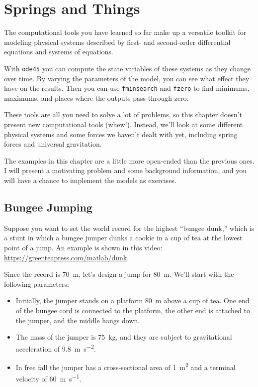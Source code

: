 \chapter{Springs and Things}


The computational tools you have learned so far make up a versatile toolkit for modeling physical systems described by first- and second-order differential equations and systems of equations.

With \lstinline{ode45} you can compute the state variables of these systems as they change over time.
By varying the parameters of the model, you can see what effect they have on the results.
Then you can use \lstinline{fminsearch} and \lstinline{fzero} to find minimums, maximums, and places where the outputs pass through zero.

These tools are all you need to solve a lot of problems, so this chapter doesn't present new computational tools (whew!).  Instead, we'll look at some different physical systems and some forces we haven't dealt with yet, including spring forces and universal gravitation.

The examples in this chapter are a little more open-ended than the previous ones.
I will present a motivating problem and some background information, and you will have a chance to implement the models as exercises.


\section{Bungee Jumping}
\label{bungee}


Suppose you want to set the world record for the highest ``bungee dunk,'' which is a stunt in which a bungee jumper dunks a cookie in a cup of tea at the lowest point of a jump.  An example is shown in this video: \url{https://greenteapress.com/matlab/dunk}.

Since the record is \SI{70}{\meter}, let's design a jump for \SI{80}{\meter}.  We'll start with the following parameters:

\begin{itemize}

\item  Initially, the jumper stands on a platform \SI{80}{\meter} above a cup of tea.  One end of the bungee cord is connected to the platform, the other end is attached to the jumper, and the middle hangs down.

\item The mass of the jumper is \SI{75}{\kilogram}, and they are subject to gravitational acceleration of \SI{9.8}{\meter \per \second \squared}.

\item In free fall the jumper has a cross-sectional area of \SI{1}{\meter\squared} and a terminal velocity of \SI{60}{\meter\per\second}.

\end{itemize}

